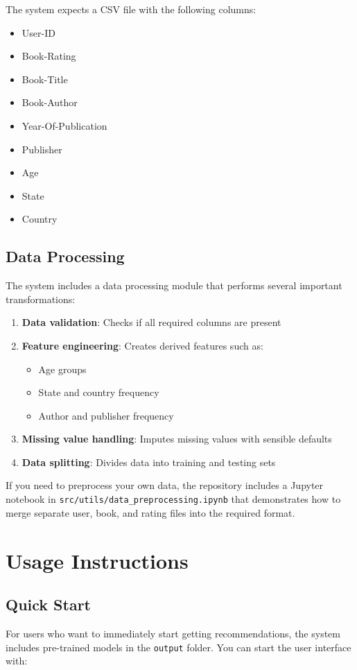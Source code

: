 \documentclass[12pt, a4paper, oneside]{book}
\begin{document}
The system expects a CSV file with the following columns:
\begin{itemize}
    \item User-ID
    \item Book-Rating
    \item Book-Title
    \item Book-Author
    \item Year-Of-Publication
    \item Publisher
    \item Age
    \item State
    \item Country
\end{itemize}

\section{Data Processing}
The system includes a data processing module that performs several important transformations:

\begin{enumerate}
    \item \textbf{Data validation}: Checks if all required columns are present
    \item \textbf{Feature engineering}: Creates derived features such as:
        \begin{itemize}
            \item Age groups
            \item State and country frequency
            \item Author and publisher frequency
        \end{itemize}
    \item \textbf{Missing value handling}: Imputes missing values with sensible defaults
    \item \textbf{Data splitting}: Divides data into training and testing sets
\end{enumerate}

If you need to preprocess your own data, the repository includes a Jupyter notebook in \texttt{src/utils/data\_preprocessing.ipynb} that demonstrates how to merge separate user, book, and rating files into the required format.

\chapter{Usage Instructions}

\section{Quick Start}
For users who want to immediately start getting recommendations, the system includes pre-trained models in the \texttt{output} folder. You can start the user interface with:
\end{document}
